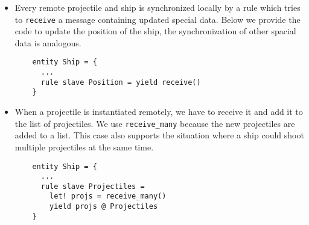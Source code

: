 \begin{itemize}[(i)]
	\item Every remote projectile and ship is synchronized locally by a rule which tries to \texttt{receive} a message containing updated special data. Below we provide the code to update the position of the ship, the synchronization of other spacial data is analogous.
	
	\begin{lstlisting}
	entity Ship = {
	  ...
	  rule slave Position = yield receive()
	}
	\end{lstlisting}
	
	\item When a projectile is instantiated remotely, we have to receive it and add it to the list of projectiles. We use \texttt{receive\_many} because the new projectiles are added to a list. This case also supports the situation where a ship could shoot multiple projectiles at the same time.

	\begin{lstlisting}
	entity Ship = {
	  ...
	  rule slave Projectiles =
	    let! projs = receive_many()
	    yield projs @ Projectiles
	}
	\end{lstlisting} 
\end{itemize}